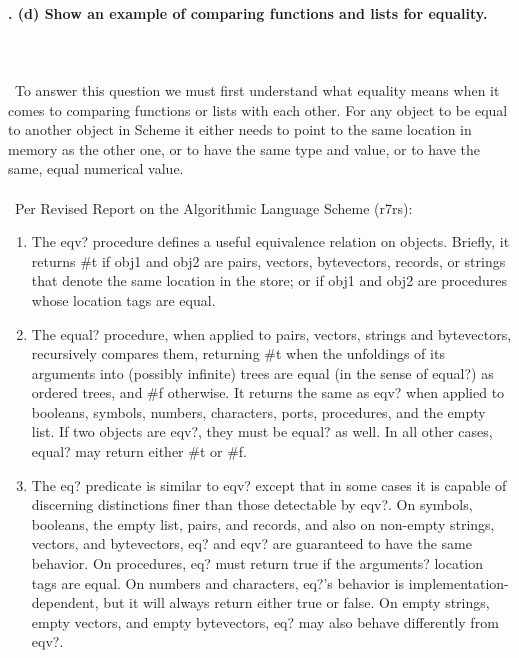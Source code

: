 \documentclass{article}
\begin{document}
\paragraph{. (d) Show an example of comparing functions and lists for equality.}\
\paragraph{}\
To answer this question we must first understand what equality means when it comes to comparing functions or lists with each other. For any object to be equal to another object in Scheme it either needs to point to the same location in memory as the other one, or to have the same type and value, or to have the same, equal numerical value. 

\paragraph{}\
Per Revised Report on the Algorithmic Language Scheme (r7rs):

	\begin{enumerate}[label=-]
				
		\item The eqv? procedure defines a useful equivalence relation on objects. Briefly, it returns \#t if obj1 and obj2 are pairs, vectors, bytevectors, records, or strings that denote the same location in the store; or if obj1 and obj2 are procedures whose location tags are equal.
					
		\item The equal? procedure, when applied to pairs, vectors, strings and bytevectors, recursively compares them, returning \#t when the unfoldings of its arguments into (possibly infinite) trees are equal (in the sense of equal?) as ordered trees, and \#f otherwise. It returns the same as eqv? when applied to booleans, symbols, numbers, characters, ports, procedures, and the empty list. If two objects are eqv?, they must be equal? as well. In all other cases, equal? may return either \#t or \#f.
					
		\item The eq? predicate is similar to eqv? except that in some cases it is capable of discerning distinctions finer than those detectable by eqv?. On symbols, booleans, the empty list, pairs, and records, and also on non-empty strings, vectors, and bytevectors, eq? and eqv? are guaranteed to have the same behavior. On procedures, eq? must return true if the arguments? location tags are equal. On numbers and characters, eq?'s behavior is implementation-dependent, but it will always return either true or false. On empty strings, empty vectors, and empty bytevectors, eq? may also behave differently from eqv?.
					
	\end{enumerate}
	
\end{document}
